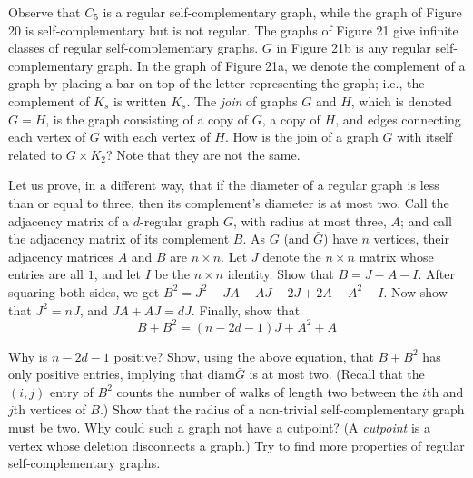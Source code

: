 \documentclass{article}
\begin{document}
\begin{description}
  Observe that $C_5$ is a regular self-complementary graph, while the graph of Figure 20 is self-complementary but is not regular. The graphs of Figure 21 give infinite classes of regular self-complementary graphs. $G$ in Figure 21b is any regular self-complementary graph. In the graph of Figure 21a, we denote the complement of a graph by placing a bar on top of the letter representing the graph; i.e., the complement of $K_s$ is written $\bar{K}_s$. The \emph{join} of graphs $G$ and $H$, which is denoted $G = H$, is the graph consisting of a copy of $G$, a copy of $H$, and edges connecting each vertex of $G$ with each vertex of $H$. How is the join of a graph $G$ with itself related to $G \times K_2$? Note that they are not the same.

  Let us prove, in a different way, that if the diameter of a regular graph is less than or equal to three, then its complement's diameter is at most two. Call the adjacency matrix of a $d$-regular graph $G$, with radius at most three, $A$; and call the adjacency matrix of its complement $B$. As $G$ (and $\bar{G}$) have $n$ vertices, their adjacency matrices $A$ and $B$ are $n \times n$. Let $J$ denote the $n \times n$ matrix whose entries are all $1$, and let $I$ be the $n \times n$ identity. Show that $B = J - A - I$. After squaring both sides, we get $B^2 = J^2 - JA - AJ - 2J + 2A + A^2 + I$. Now show that $J^2 = nJ$, and $JA + AJ = dJ$. Finally, show that
    \begin{equation*}
    B + B^2 = (n - 2d - 1) J + A^2 + A
    \end{equation*}

  Why is $n - 2d - 1$ positive? Show, using the above equation, that $B + B^2$ has only positive entries, implying that $\text{diam} \bar{G}$ is at most two. (Recall that the $(i,j)$ entry of $B^2$ counts the number of walks of length two between the $i$th and $j$th vertices of $B$.) Show that the radius of a non-trivial self-complementary graph must be two. Why could such a graph not have a cutpoint? (A \emph{cutpoint} is a vertex whose deletion disconnects a graph.) Try to find more properties of regular self-complementary graphs.


\end{description}
\end{document}
